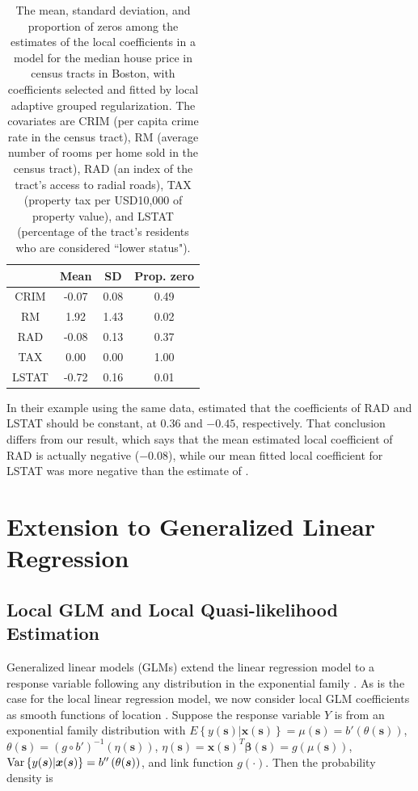 \documentclass[authoryear,review, 12pt]{elsarticle}
\begin{document}
\begin{table}
\centering
\begin{tabular}{|c|ccc|}
  \hline
 & Mean & SD & Prop. zero \\ 
  \hline
CRIM & -0.07 & 0.08 & 0.49 \\ 
  RM & 1.92 & 1.43 & 0.02 \\ 
  RAD & -0.08 & 0.13 & 0.37 \\ 
  TAX & 0.00 & 0.00 & 1.00 \\ 
  LSTAT & -0.72 & 0.16 & 0.01 \\ 
   \hline
\end{tabular}
\caption{The mean, standard deviation, and proportion of zeros among the estimates of the local coefficients in a model for the median house price in census tracts in Boston, with coefficients selected and fitted by local adaptive grouped regularization. The covariates are CRIM (per capita crime rate in the census tract), RM (average number of rooms per home sold in the census tract), RAD (an index of the tract's access to radial roads), TAX (property tax per USD10,000 of property value), and LSTAT (percentage of the tract's residents who are considered ``lower status").} 
\label{tab:boston-coefs-lagr}
\end{table}


In their example using the same data, \citet{Sun-Yan-Zhang-Lu-2014}
estimated that the coefficients of RAD and LSTAT should be constant,
at $0.36$ and $-0.45$, respectively. That conclusion differs from
our result, which says that the mean estimated local coefficient of
RAD is actually negative (\ensuremath{-0.08}),
while our mean fitted local coefficient for LSTAT was more negative
than the estimate of \citet{Sun-Yan-Zhang-Lu-2014}.


\section{Extension to Generalized Linear Regression\label{sec:lagr-gllm}}


\subsection{Local GLM and Local Quasi-likelihood Estimation}

Generalized linear models (GLMs) extend the linear regression model
to a response variable following any distribution in the exponential
family \citep{McCullagh-Nelder-1989}. As is the case for the local
linear regression model, we now consider local GLM coefficients as
smooth functions of location \citep{Cai-Fan-Li-2000}. Suppose the
response variable $Y$ is from an exponential family distribution
with $E\left\{ y(\bm{s})|\bm{x}(\bm{s})\right\} =\mu(\bm{s})=b'\left(\theta(\bm{s})\right)$,
$\theta(\bm{s})=(g\circ b')^{-1}\left(\eta(\bm{s})\right)$, $\eta(\bm{s})=\bm{x}(\bm{s})^{T}\bm{\beta}(\bm{s})=g\left(\mu(\bm{s})\right)$,
$\text{\text{Var}}\left\{ y(\bm{s})|\bm{x}(\bm{s})\right\} =b''\left(\theta(\bm{s})\right)$,
and link function $g(\cdot)$. Then the probability density is 
\end{document}
